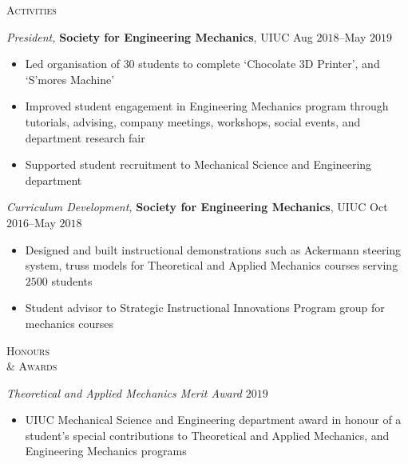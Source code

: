 \documentclass[10pt]{article}
\begin{document}
\begin{multicols}{2}
\textsc{\small Activities}
\columnbreak

{\sl President,} \textbf{Society for Engineering Mechanics}, UIUC \hfill Aug $2018$--May $2019$

\vspace{-1.75em}
\begin{itemize}[label=-]
    \setlength\itemsep{-0.25em}
    \item Led organisation of $30$ students to complete `Chocolate 3D Printer', and `S'mores Machine'
    \item Improved student engagement in Engineering Mechanics program through tutorials, advising, company meetings, workshops, social events, and department research fair
    \item Supported student recruitment to Mechanical Science and Engineering department
\end{itemize}
\vspace{-2.0em}

\vspace{0.5em}
%
{\sl Curriculum Development,} \textbf{Society for Engineering Mechanics}, UIUC \hfill Oct $2016$--May $2018$

\vspace{-1.75em}
\begin{itemize}[label=-]
    \setlength\itemsep{-0.25em}
    \item Designed and built instructional demonstrations such as  Ackermann steering system, truss models for Theoretical and Applied Mechanics courses serving $2500$ students
    \item Student advisor to Strategic Instructional Innovations Program group for mechanics courses
\end{itemize}
\vspace{-2.0em}

\end{multicols}
\vspace{-1.5em} 
\begin{multicols}{2}
\textsc{\small Honours \\ \& Awards}
\columnbreak

{\sl Theoretical and Applied Mechanics Merit Award} \hfill $2019$

\vspace{-1.75em}
\begin{itemize}[label= ]
    \setlength\itemsep{-0.25em}
    \item  UIUC Mechanical Science and Engineering department award in honour of a student's special contributions to Theoretical and Applied Mechanics, and Engineering Mechanics programs
\end{itemize}
\vspace{-2.0em}

\end{multicols}
\end{document}
